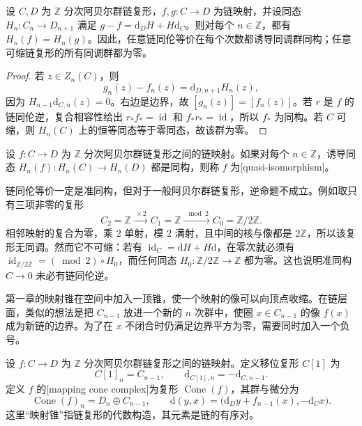 \begin{proposition}\label{g2:prop:chain-homotopy-homology}
	设 \(C,D\) 为 \(\mathbb Z\) 分次阿贝尔群链复形，\(f,g:C\to D\) 为链映射，并设同态 \(H_n:C_n\to D_{n+1}\) 满足 \(g-f=\mathrm{d}_DH+H\mathrm{d}_C\)。则对每个 \(n\in\mathbb Z\)，都有 \(H_n(f)=H_n(g)\)。因此，任意链同伦等价在每个次数都诱导同调群同构；任意可缩链复形的所有同调群都为零。
\end{proposition}
\begin{proof}
	若 \(z\in Z_n(C)\)，则
	\[
		g_n(z)-f_n(z)=\mathrm{d}_{D,n+1}H_n(z),
	\]
	因为 \(H_{n-1}\mathrm{d}_{C,n}(z)=0\)。右边是边界，故 \([g_n(z)]=[f_n(z)]\)。若 \(r\) 是 \(f\) 的链同伦逆，复合相容性给出 \(r_*f_*=\operatorname{id}\) 和 \(f_*r_*=\operatorname{id}\)，所以 \(f_*\) 为同构。若 \(C\) 可缩，则 \(H_n(C)\) 上的恒等同态等于零同态，故该群为零。
\end{proof}

\begin{definition}[准同构]\label{g2:def:quasi-isomorphism}
	设 \(f:C\to D\) 为 \(\mathbb Z\) 分次阿贝尔群链复形之间的链映射。如果对每个 \(n\in\mathbb Z\)，诱导同态 \(H_n(f):H_n(C)\to H_n(D)\) 都是同构，则称 \(f\) 为[quasi-isomorphism]。
\end{definition}

链同伦等价一定是准同构，但对于一般阿贝尔群链复形，逆命题不成立。例如取只有三项非零的复形
\[
	C_2=\mathbb Z\xrightarrow{\ \times2\ }C_1=\mathbb Z
	\xrightarrow{\ \bmod2\ }C_0=\mathbb Z/2\mathbb Z.
\]
相邻映射的复合为零，乘 \(2\) 单射，模 \(2\) 满射，且中间的核与像都是 \(2\mathbb Z\)，所以该复形无同调。然而它不可缩：若有 \(\operatorname{id}_C=\mathrm{d}H+H\mathrm{d}\)，在零次就必须有
\(\operatorname{id}_{\mathbb Z/2\mathbb Z}=(\bmod2)\circ H_0\)，而任何同态 \(H_0:\mathbb Z/2\mathbb Z\to\mathbb Z\) 都为零。这也说明准同构 \(C\to0\) 未必有链同伦逆。

第一章的映射锥在空间中加入一顶锥，使一个映射的像可以向顶点收缩。在链层面，类似的想法是把 \(C_{n-1}\) 放进一个新的 \(n\) 次群中，使圈 \(x\in C_{n-1}\) 的像 \(f(x)\) 成为新链的边界。为了在 \(x\) 不闭合时仍满足边界平方为零，需要同时加入一个负号。

\begin{definition}[移位与链复形的映射锥]\label{g2:def:algebraic-mapping-cone}
	设 \(f:C\to D\) 为 \(\mathbb Z\) 分次阿贝尔群链复形之间的链映射。定义移位复形 \(C[1]\) 为
	\[
		C[1]_n=C_{n-1},\qquad
		\mathrm{d}_{C[1],n}=-\mathrm{d}_{C,n-1}.
	\]
	定义 \(f\) 的[mapping cone complex]为复形 \(\operatorname{Cone}(f)\)，其群与微分为
	\[
		\operatorname{Cone}(f)_n=D_n\oplus C_{n-1},\qquad
		\mathrm{d}(y,x)=\bigl(\mathrm{d}_Dy+f_{n-1}(x),-\mathrm{d}_Cx\bigr).
	\]
	这里“映射锥”指链复形的代数构造，其元素是链的有序对。
\end{definition}

